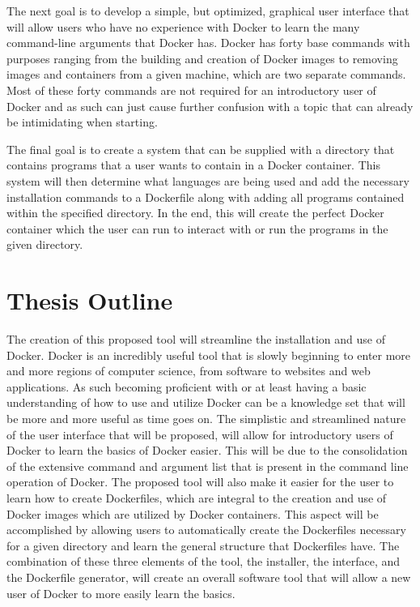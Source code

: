 The next goal is to develop a simple, but optimized, graphical user interface that will allow users who have no experience with Docker to learn the many command-line arguments that Docker has. Docker has forty base commands with purposes ranging from the building and creation of Docker images to removing images and containers from a given machine, which are two separate commands. Most of these forty commands are not required for an introductory user of Docker and as such can just cause further confusion with a topic that can already be intimidating when starting.

The final goal is to create a system that can be supplied with a directory that contains programs that a user wants to contain in a Docker container. This system will then determine what languages are being used and add the necessary installation commands to a Dockerfile along with adding all programs contained within the specified directory. In the end, this will create the perfect Docker container which the user can run to interact with or run the programs in the given directory.

\section{Thesis Outline}
\label{sec:outline}

The creation of this proposed tool will streamline the installation and use of Docker. Docker is an incredibly useful tool that is slowly beginning to enter more and more regions of computer science, from software to websites and web applications. As such becoming proficient with or at least having a basic understanding of how to use and utilize Docker can be a knowledge set that will be more and more useful as time goes on. The simplistic and streamlined nature of the user interface that will be proposed, will allow for introductory users of Docker to learn the basics of Docker easier. This will be due to the consolidation of the extensive command and argument list that is present in the command line operation of Docker. The proposed tool will also make it easier for the user to learn how to create Dockerfiles, which are integral to the creation and use of Docker images which are utilized by Docker containers. This aspect will be accomplished by allowing users to automatically create the Dockerfiles necessary for a given directory and learn the general structure that Dockerfiles have. The combination of these three elements of the tool, the installer, the interface, and the Dockerfile generator, will create an overall software tool that will allow a new user of Docker to more easily learn the basics.
